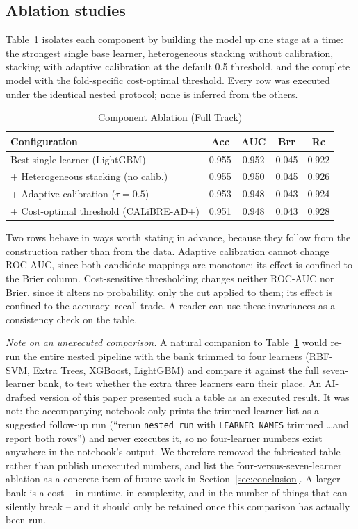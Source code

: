 \documentclass[conference]{IEEEtran}
\begin{document}
\subsection{Ablation studies}
\label{sec:ablation}
Table~\ref{tab:ablation} isolates each component by building the model up one stage at a time: the strongest single base learner, heterogeneous stacking without calibration, stacking with adaptive calibration at the default 0.5 threshold, and the complete model with the fold-specific cost-optimal threshold. Every row was executed under the identical nested protocol; none is inferred from the others.

\begin{table}[!t]
\caption{Component Ablation (Full Track)}
\label{tab:ablation}
\centering
\footnotesize
\begin{tabular}{@{}p{4.3cm}cccc@{}}
\toprule
\textbf{Configuration} & \textbf{Acc} & \textbf{AUC} & \textbf{Brr} & \textbf{Rc} \\
\midrule
Best single learner (LightGBM) & 0.955 & 0.952 & 0.045 & 0.922 \\
+ Heterogeneous stacking (no calib.) & 0.955 & 0.950 & 0.045 & 0.926 \\
+ Adaptive calibration ($\tau=0.5$) & 0.953 & 0.948 & 0.043 & 0.924 \\
+ Cost-optimal threshold (CALiBRE-AD+) & 0.951 & 0.948 & 0.043 & 0.928 \\
\bottomrule
\end{tabular}
\end{table}

Two rows behave in ways worth stating in advance, because they follow from the construction rather than from the data. Adaptive calibration cannot change ROC-AUC, since both candidate mappings are monotone; its effect is confined to the Brier column. Cost-sensitive thresholding changes neither ROC-AUC nor Brier, since it alters no probability, only the cut applied to them; its effect is confined to the accuracy--recall trade. A reader can use these invariances as a consistency check on the table.

\textit{Note on an unexecuted comparison.} A natural companion to Table~\ref{tab:ablation} would re-run the entire nested pipeline with the bank trimmed to four learners (RBF-SVM, Extra Trees, XGBoost, LightGBM) and compare it against the full seven-learner bank, to test whether the extra three learners earn their place. An AI-drafted version of this paper presented such a table as an executed result. It was not: the accompanying notebook only prints the trimmed learner list as a suggested follow-up run (``rerun \texttt{nested\_run} with \texttt{LEARNER\_NAMES} trimmed \ldots and report both rows'') and never executes it, so no four-learner numbers exist anywhere in the notebook's output. We therefore removed the fabricated table rather than publish unexecuted numbers, and list the four-versus-seven-learner ablation as a concrete item of future work in Section~\ref{sec:conclusion}. A larger bank is a cost -- in runtime, in complexity, and in the number of things that can silently break -- and it should only be retained once this comparison has actually been run.
\end{document}
